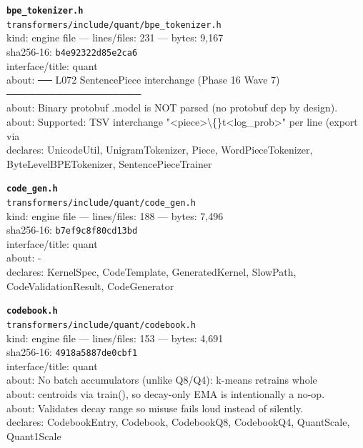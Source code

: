 \noindent\textbf{\texttt{bpe\_tokenizer.h}}\\
\texttt{transformers/include/quant/bpe\_tokenizer.h}\\
kind: engine file --- lines/files: 231 --- bytes: 9,167\\
sha256-16: \texttt{b4e92322d85e2ca6}\\
interface/title: quant\\
about: ── L072 SentencePiece interchange (Phase 16 Wave 7) ───────────────────\\
about: Binary protobuf .model is NOT parsed (no protobuf dep by design).\\
about: Supported: TSV interchange "<piece>\textbackslash\{\}t<log\_prob>" per line (export via\\
declares: UnicodeUtil, UnigramTokenizer, Piece, WordPieceTokenizer, ByteLevelBPETokenizer, SentencePieceTrainer\\
\vspace*{6.0pt}

\noindent\textbf{\texttt{code\_gen.h}}\\
\texttt{transformers/include/quant/code\_gen.h}\\
kind: engine file --- lines/files: 188 --- bytes: 7,496\\
sha256-16: \texttt{b7ef9c8f80cd13bd}\\
interface/title: quant\\
about: -\\
declares: KernelSpec, CodeTemplate, GeneratedKernel, SlowPath, CodeValidationResult, CodeGenerator\\
\vspace*{6.0pt}

\noindent\textbf{\texttt{codebook.h}}\\
\texttt{transformers/include/quant/codebook.h}\\
kind: engine file --- lines/files: 153 --- bytes: 4,691\\
sha256-16: \texttt{4918a5887de0cbf1}\\
interface/title: quant\\
about: No batch accumulators (unlike Q8/Q4): k-means retrains whole\\
about: centroids via train(), so decay-only EMA is intentionally a no-op.\\
about: Validates decay range so misuse fails loud instead of silently.\\
declares: CodebookEntry, Codebook, CodebookQ8, CodebookQ4, QuantScale, Quant1Scale\\
\vspace*{6.0pt}

